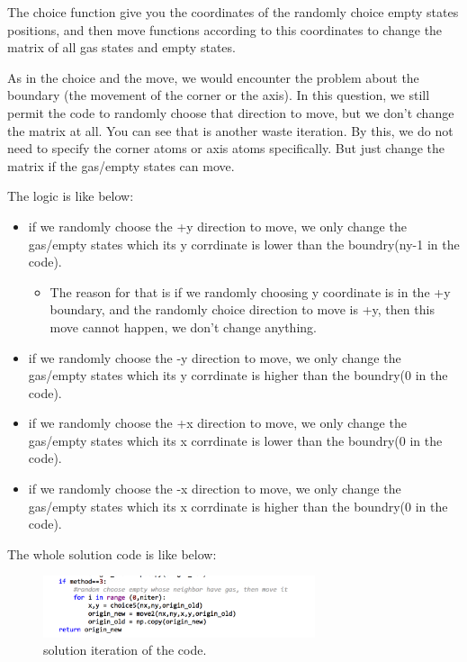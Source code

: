 \documentclass[11pt, oneside]{article}  	%
\begin{document}
The choice function give you the coordinates of the randomly choice empty states positions, and then move functions according to this coordinates to change the matrix of all gas states and empty states. 

As in the choice and the move, we would encounter the problem about the boundary (the movement of the corner or the axis). In this question, we still permit the code to randomly choose that direction to move, but we don't change the matrix at all. You can see that is another waste iteration. 
By this, we do not need to specify the corner atoms or axis atoms specifically. But just change the matrix if the gas/empty states can move.

The logic is like below:
\begin{itemize}
\item if we randomly choose the +y direction to move, we only change the gas/empty states which its y corrdinate is lower than the boundry(ny-1 in the code).
\begin{itemize}
\item The reason for that is if we randomly choosing y coordinate is in the +y boundary, and the randomly choice direction to move is +y, then this move cannot happen, we don't change anything.
\end{itemize}
\item if we randomly choose the -y direction to move, we only change the gas/empty states which its y corrdinate is higher than the boundry(0 in the code).
\item if we randomly choose the +x direction to move, we only change the gas/empty states which its x corrdinate is lower than the boundry(0 in the code).
\item if we randomly choose the -x direction to move, we only change the gas/empty states which its x corrdinate is higher than the boundry(0 in the code).
\end{itemize}

The whole solution code is like below: 
\begin{figure}[htbp]
\begin{center}
\includegraphics[width=8cm]{code-3-2.png}
\caption{solution iteration of the code.}
\label{default}
\end{center}
\end{figure}
\end{document}
